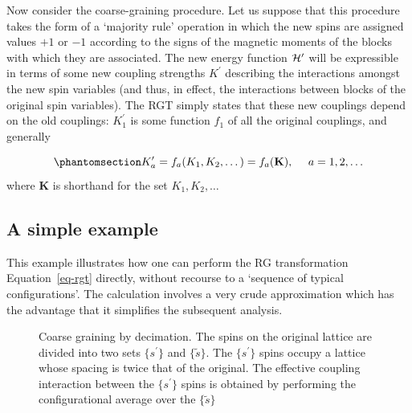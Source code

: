 \documentclass[
  letterpaper,
  enabledeprecatedfontcommands]{report}
\begin{document}
\begin{tcolorbox}
Now consider the coarse-graining procedure. Let us suppose that this
procedure takes the form of a `majority rule' operation in which the new
spins are assigned values \(+1\) or \(-1\) according to the signs of the
magnetic moments of the blocks with which they are associated. The new
energy function \({\cal H}^\prime\) will be expressible in terms of some
new coupling strengths \(K^\prime\) describing the interactions amongst
the new spin variables (and thus, in effect, the interactions between
blocks of the original spin variables). The RGT simply states that these
new couplings depend on the old couplings: \(K_1^\prime\) is some
function \(f_1\) of all the original couplings, and generally

\begin{equation}\phantomsection\label{eq-rgt}{K^\prime_a=f_a(K_1,K_2,\dots) =f_a({\bf K}),~~~~ a= 1, 2,\dots
}\end{equation} where \textbf{K} is shorthand for the set
\(K_1, K_2,\dots\)

\subsection{A simple example}\label{a-simple-example}

This example illustrates how one can perform the RG transformation
Equation~\ref{eq-rgt} directly, without recourse to a `sequence of
typical configurations'. The calculation involves a very crude
approximation which has the advantage that it simplifies the subsequent
analysis.

\begin{figure}[H]


\caption{\label{fig-rglat}Coarse graining by decimation. The spins on
the original lattice are divided into two sets \(\{s^\prime\}\) and
\(\{\tilde{s}\}\). The \(\{s^\prime\}\) spins occupy a lattice whose
spacing is twice that of the original. The effective coupling
interaction between the \(\{s^\prime\}\) spins is obtained by performing
the configurational average over the \(\{\tilde{s}\}\)}


\end{figure}
\end{tcolorbox}
\end{document}
